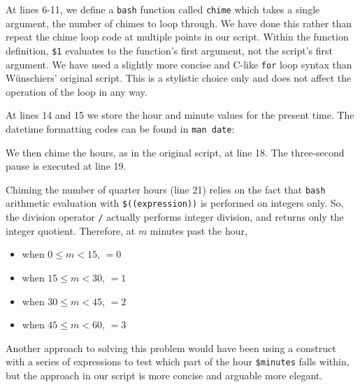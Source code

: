 \documentclass{article}
\begin{document}
At lines 6-11, we define a \texttt{bash} function called \texttt{chime} which takes a single argument, the number of chimes to loop through. We have done this rather than repeat the chime loop code at multiple points in our script. Within the function definition, \texttt{\$1} evaluates to the function's first argument, not the script's first argument. We have used a slightly more concise and C-like \texttt{for} loop syntax than Wünschiers' original script. This is a stylistic choice only and does not affect the operation of the loop in any way.

At lines 14 and 15 we store the hour and minute values for the present time. The datetime formatting codes can be found in \texttt{man date}:

\begin{bashinline}
\end{bashinline}

We then chime the hours, as in the original script, at line 18. The three-second pause is executed at line 19.

Chiming the number of quarter hours (line 21) relies on the fact that \texttt{bash} arithmetic evaluation with \texttt{\$((expression))} is performed on integers only. So, the division operator \texttt{/} actually performs integer division, and returns only the integer quotient. Therefore, at $m$ minutes past the hour,
\begin{itemize}
    \item when $0 \leq m < 15$,  $= 0$
    \item when $15 \leq m < 30$,  $= 1$
    \item when $30 \leq m < 45$,  $= 2$
    \item when $45 \leq m < 60$,  $= 3$
\end{itemize}

Another approach to solving this problem would have been using a  construct with a series of expressions to test which part of the hour \texttt{\$minutes} falls within, but the approach in our script is more concise and arguable more elegant.
\end{document}
